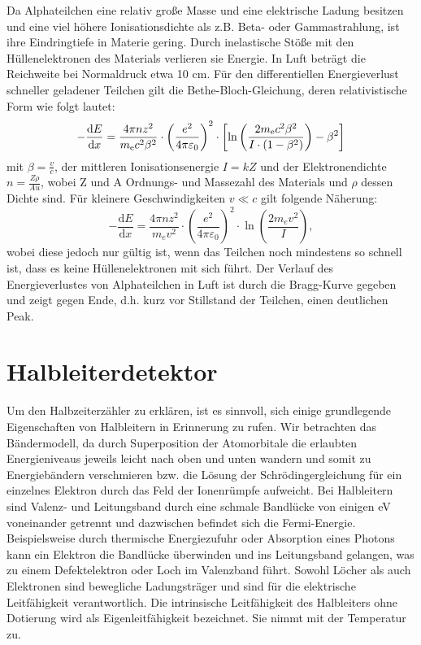 \documentclass[bigchapter,colorback,accentcolor=tud4b,linedtoc,11pt]{tudreport}
\begin{document}
Da Alphateilchen eine relativ große Masse und eine elektrische Ladung besitzen und eine viel höhere Ionisationsdichte als z.B. Beta- oder Gammastrahlung, ist ihre Eindringtiefe in Materie gering. Durch inelastische Stöße mit den Hüllenelektronen des Materials verlieren sie Energie. In Luft beträgt die Reichweite bei Normaldruck etwa 10 cm. Für den differentiellen Energieverlust schneller geladener Teilchen gilt die Bethe-Bloch-Gleichung, deren relativistische Form wie folgt lautet:
$$ - \frac{\mathrm{d}E}{\mathrm{d}x} = \frac{4 \pi nz^2}{m_{\rm e} c^2 \beta^2 } \cdot \left(\frac{e^2}{4\pi\varepsilon_0}\right)^2 \cdot \left[\ln \left(\frac{2m_{\rm e} c^2 \beta^2}{I \cdot (1-\beta^2)}\right) - \beta^2\right]$$
mit $\beta = \frac{v}{c}$, der mittleren Ionisationsenergie $I = kZ$ und der Elektronendichte $n = \frac{Z \rho}{A u}$, wobei Z und A Ordnungs- und Massezahl des Materials und $\rho$ dessen Dichte sind.
Für kleinere Geschwindigkeiten $v \ll c$ gilt folgende Näherung: 
$$- \frac{\mathrm{d}E}{\mathrm{d}x} = \frac{4 \pi nz^2}{m_e v^2}
\cdot \left(\frac{e^2}{4\pi\varepsilon_0}\right)^2
\cdot \ln \left(\frac{2m_e v^2 }{I}\right),$$
wobei diese jedoch nur gültig ist, wenn das Teilchen noch mindestens so schnell ist, dass es keine Hüllenelektronen mit sich führt.
Der Verlauf des Energieverlustes von Alphateilchen in Luft ist durch die Bragg-Kurve gegeben und zeigt gegen Ende, d.h. kurz vor Stillstand der Teilchen, einen deutlichen Peak.

\section{Halbleiterdetektor}
\color{blue}
Um den Halbzeiterzähler zu erklären, ist es sinnvoll, sich einige grundlegende Eigenschaften von Halbleitern in Erinnerung zu rufen. Wir betrachten das Bändermodell, da durch Superposition der Atomorbitale die erlaubten Energieniveaus jeweils leicht nach oben und unten wandern und somit zu Energiebändern verschmieren bzw. die Lösung der Schrödingergleichung für ein einzelnes Elektron durch das Feld der Ionenrümpfe aufweicht. Bei Halbleitern sind Valenz- und Leitungsband durch eine schmale Bandlücke von einigen eV voneinander getrennt und dazwischen befindet sich die Fermi-Energie. Beispielsweise durch thermische Energiezufuhr oder Absorption eines Photons kann ein Elektron die Bandlücke überwinden und ins Leitungsband gelangen, was zu einem Defektelektron oder Loch im Valenzband führt. Sowohl Löcher als auch Elektronen sind bewegliche Ladungsträger und sind für die elektrische Leitfähigkeit  verantwortlich. Die intrinsische Leitfähigkeit des Halbleiters ohne Dotierung wird als Eigenleitfähigkeit bezeichnet. Sie nimmt mit der Temperatur zu. 
\end{document}
